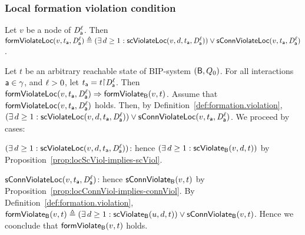 



\subsubsection{Local formation violation condition}

\label{def:locFormation.violation}
Let $v$ be a node of $\mathit{D}_{\mathsf{a}}^{\ell}$.
Then $\mathsf{formViolateLoc}(v,t_{\mathsf{a}},\mathit{D}_{\mathsf{a}}^{\ell})  \triangleq  (\exists\, d \ge 1: \mathsf{scViolateLoc}(v,d,t_{\mathsf{a}},\mathit{D}_{\mathsf{a}}^{\ell})) \lor \mathsf{sConnViolateLoc}(v,t_{\mathsf{a}},\mathit{D}_{\mathsf{a}}^{\ell})$.
\ed
%



\bp \label{prop:locFromViol-implies-formViol}
\label{prop:locformviol-implies-formviol}
Let $t$ be an arbitrary reachable state of BIP-system $(\mathsf{B}, Q_0)$.
For all interactions $\mathsf{a} \in \gamma$, and $\ell > 0$, let $t_\act = t \pj \dsk{\act}{\l}$.
Then\\
\ind $ \mathsf{formViolateLoc}(v,t_{\mathsf{a}},\mathit{D}_{\mathsf{a}}^{\ell}) \Rightarrow \mathsf{formViolate}_{\mathsf{B}}(v,t)$.
\ep
%
\bpr
Assume that $\mathsf{formViolateLoc}(v,t_{\mathsf{a}},\mathit{D}_{\mathsf{a}}^{\ell})$ holds. Then, by Definition~\ref{def:formation.violation}, 
$(\exists\, d \ge 1: \mathsf{scViolateLoc}(v,d,t_{\mathsf{a}},\mathit{D}_{\mathsf{a}}^{\ell})) \lor \mathsf{sConnViolateLoc}(v,t_{\mathsf{a}},\mathit{D}_{\mathsf{a}}^{\ell})$.
We proceed by cases:
\bn
\item $(\exists\, d \ge 1: \mathsf{scViolateLoc}(v,d,t_{\mathsf{a}},\mathit{D}_{\mathsf{a}}^{\ell}))$: hence $(\exists\, d \ge 1: \mathsf{scViolate}_{\mathsf{B}}(v,d,t))$ by Proposition~\ref{prop:locScViol-implies-scViol}.
\item $\mathsf{sConnViolateLoc}(v,t_{\mathsf{a}},\mathit{D}_{\mathsf{a}}^{\ell})$: hence $\mathsf{sConnViolate}_{\mathsf{B}}(v,t)$ by Proposition~\ref{prop:locConnViol-implies-connViol}.
\en
By Definition~\ref{def:formation.violation},  $\mathsf{formViolate}_{\mathsf{B}}(v,t)  \triangleq (\exists\, d \ge 1: \mathsf{scViolate}_{\mathsf{B}}(u,d,t)) \lor \mathsf{sConnViolate}_{\mathsf{B}}(v,t)$.
Hence we coonclude that $\mathsf{formViolate}_{\mathsf{B}}(v,t)$ holds.
\epr




